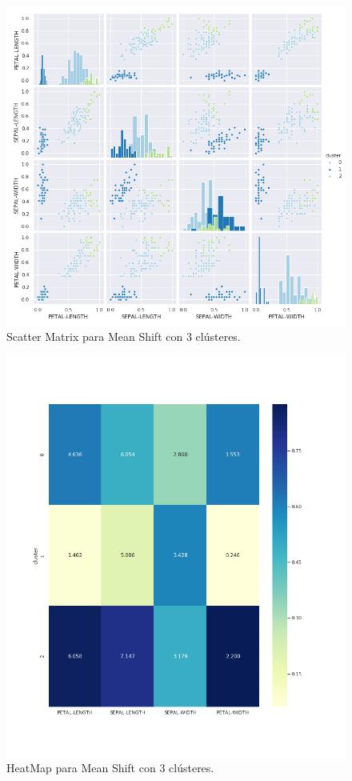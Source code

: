 \documentclass[a4paper, 20pt]{article}
\begin{document}
\begin{figure}[h]
\centering
\includegraphics[scale=0.62]{dani/scatmatrixMeanShiftIRIS.png}
\caption{Scatter Matrix para Mean Shift con 3 clústeres.}
\label{smms}
\end{figure}

\clearpage

\begin{figure}[h]
\centering
\includegraphics[scale=0.62]{dani/heatmapMeanShiftIRIS.png}
\caption{HeatMap para Mean Shift con 3 clústeres.}
\label{hmms}
\end{figure}
\end{document}
